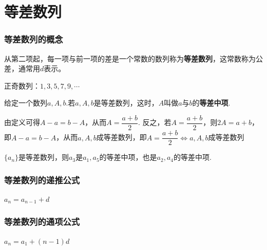 \section*{等差数列}
\subsubsection*{等差数列的概念}
从第二项起，每一项与前一项的差是一个常数的数列称为\textbf{等差数列}，这常数称为公差，通常用$d$表示。
\begin{example}
    正奇数列：$1,3,5,7,9,\cdots$
\end{example}
给定一个数列$a, A, b$.若$a, A, b$是等差数列，这时，$A$叫做$a$与$b$的\textbf{等差中项}.

由定义可得$A-a=b-A$，从而$A = \dfrac{a+b}{2}$. 反之，若$A = \dfrac{a+b}{2}$，则$2A=a+b$，即$A-a=b-A$，从而$a, A,b$成等差数列，即$A = \dfrac{a+b}{2} \Longleftrightarrow a, A, b$成等差数列
\begin{example}
    $\{a_n\}$是等差数列，则$a_3$是$a_1, a_5$的等差中项，也是$a_2, a_4$的等差中项.
\end{example}
\subsubsection*{等差数列的递推公式}
$a_n = a_{n-1} + d$
\subsubsection*{等差数列的通项公式}
$a_n = a_1 + (n-1)d$

